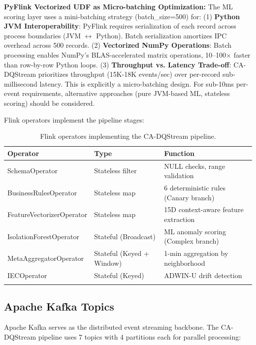 \begin{itemize}
\textbf{PyFlink Vectorized UDF as Micro-batching Optimization:} The ML scoring layer uses a mini-batching strategy (batch\_size=500) for: (1) \textbf{Python JVM Interoperability}: PyFlink requires serialization of each record across process boundaries (JVM $\leftrightarrow$ Python). Batch serialization amortizes IPC overhead across 500 records. (2) \textbf{Vectorized NumPy Operations}: Batch processing enables NumPy's BLAS-accelerated matrix operations, 10--100$\times$ faster than row-by-row Python loops. (3) \textbf{Throughput vs. Latency Trade-off}: CA-DQStream prioritizes throughput (15K-18K events/sec) over per-record sub-millisecond latency. This is explicitly a micro-batching design. For sub-10ms per-event requirements, alternative approaches (pure JVM-based ML, stateless scoring) should be considered.

\end{itemize}

Flink operators implement the pipeline stages:

\begin{longtable}{|m{4cm}|m{3.5cm}|m{5.5cm}|}
\hline
\textbf{Operator} & \textbf{Type} & \textbf{Function} \\ \hline
SchemaOperator & Stateless filter & NULL checks, range validation \\ \hline
BusinessRulesOperator & Stateless map & 6 deterministic rules (Canary branch) \\ \hline
FeatureVectorizerOperator & Stateless map & 15D context-aware feature extraction \\ \hline
IsolationForestOperator & Stateful (Broadcast) & ML anomaly scoring (Complex branch) \\ \hline
MetaAggregatorOperator & Stateful (Keyed + Window) & 1-min aggregation by neighborhood \\ \hline
IECOperator & Stateful (Keyed) & ADWIN-U drift detection \\ \hline
\caption{Flink operators implementing the CA-DQStream pipeline.}
\label{tab:flink_operators}
\end{longtable}

\subsection{Apache Kafka Topics}

Apache Kafka serves as the distributed event streaming backbone. The CA-DQStream pipeline uses 7 topics with 4 partitions each for parallel processing:

